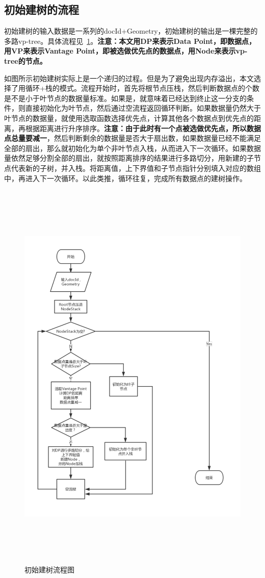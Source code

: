 \subsection{初始建树的流程}
初始建树的输入数据是一系列的docId+Geometry，初始建树的输出是一棵完整的多路vp-tree。具体流程见~\ref{create-node-flow}。\textbf{注意：本文用DP来表示Data Point，即数据点，用VP来表示Vantage Point，即被选做优先点的数据点，用Node来表示vp-tree的节点。}

如图所示初始建树实际上是一个递归的过程。但是为了避免出现内存溢出，本文选择了用循环+栈的模式。流程开始时，首先将根节点压栈，然后判断数据点的个数是不是小于叶节点的数据量标准。如果是，就意味着已经达到终止这一分支的条件，则直接初始化为叶节点，然后通过空流程返回循环判断。如果数据量仍然大于叶节点的数据量，就使用选取函数选择优先点，计算其他各个数据点到优先点的距离，再根据距离进行升序排序。\textbf{注意：由于此时有一个点被选做优先点，所以数据点总量要减一}，然后判断剩余的数据量是否大于扇出数，如果数据量已经不能满足全部的扇出，那么就初始化为单个非叶节点入栈，从而进入下一次循环。如果数据量依然足够分割全部的扇出，就按照距离排序的结果进行多路切分，用新建的子节点代表新的子树，并入栈。将距离值，上下界值和子节点指针分别填入对应的数组中，再进入下一次循环。以此类推，循环往复，完成所有数据点的建树操作。

\begin{figure}[H]
  \centering
  \includegraphics[width=5in,height=7.6in]{new_FIGs/chapter4/create-node-flow.pdf}
  \caption{初始建树流程图}\label{create-node-flow}
\end{figure}
